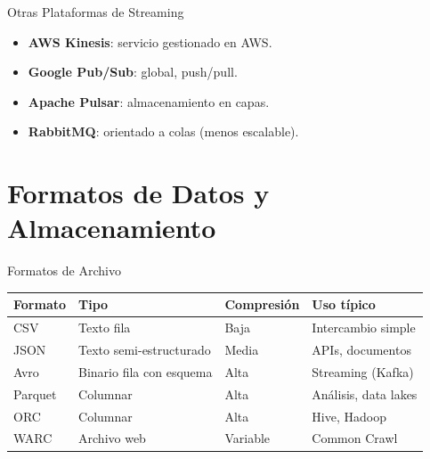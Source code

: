 \documentclass[aspectratio=169, 10pt, xcolor=table]{beamer}
\begin{document}
\begin{frame}{Otras Plataformas de Streaming}
    \begin{itemize}
        \item \textbf{AWS Kinesis}: servicio gestionado en AWS.
        \item \textbf{Google Pub/Sub}: global, push/pull.
        \item \textbf{Apache Pulsar}: almacenamiento en capas.
        \item \textbf{RabbitMQ}: orientado a colas (menos escalable).
    \end{itemize}
\end{frame}

\section{Formatos de Datos y Almacenamiento}

\begin{frame}{Formatos de Archivo}
    \begin{table}
        \centering
        \begin{tabular}{l|l|l|l}
            \toprule
            Formato & Tipo & Compresión & Uso típico \\
            \midrule
            CSV & Texto fila & Baja & Intercambio simple \\
            JSON & Texto semi-estructurado & Media & APIs, documentos \\
            Avro & Binario fila con esquema & Alta & Streaming (Kafka) \\
            Parquet & Columnar & Alta & Análisis, data lakes \\
            ORC & Columnar & Alta & Hive, Hadoop \\
            WARC & Archivo web & Variable & Common Crawl \\
            \bottomrule
        \end{tabular}
    \end{table}
\end{frame}
\end{document}
